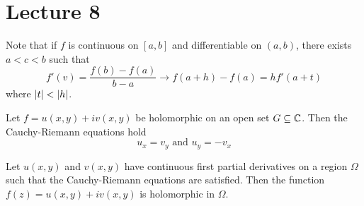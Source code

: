 \documentclass[12pt]{article}
\begin{document}
\section{Lecture 8} 
Note that if $f$ is continuous on $[a,b]$ and differentiable on $(a,b)$, there exists $a < c < b$ such that $$f'(v) = \frac{f(b) - f(a)}{b-a} \to f(a+h) - f(a) = hf'(a+t)$$ where $\abs{t} < \abs{h}$. 
\begin{theorem} Let $f = u(x,y) + iv(x,y)$ be holomorphic on an open set $G \subseteq \mathbb{C}$. Then the Cauchy-Riemann equations hold $$u_x = v_y \text{ and } u_y = -v_x $$ \end{theorem} 
\begin{theorem} Let $u(x,y)$ and $v(x,y)$ have continuous first partial derivatives on a region $\Omega$ such that the Cauchy-Riemann equations are satisfied. Then the function $f(z) = u(x,y) + iv(x,y)$ is holomorphic in $\Omega$. \end{theorem} 
\end{document}
